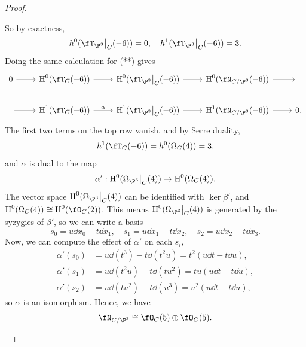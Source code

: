 \documentclass[a4paper]{article}
\begin{document}
\begin{enumerate} [label=\textbf{\arabic*.}, leftmargin=0em]
\begin{proof}
\begin{itemize} [leftmargin=0cm]
                        So by exactness,
                        \begin{equation*}
                            \cdh^0(\restr{\fT_{\P^3}}{C}(-6)) = 0, \quad \cdh^1(\restr{\fT_{\P^3}}{C}(-6)) = 3.
                        \end{equation*}
                        Doing the same calculation for (**) gives
                        \[ \begin{tikzcd}
                                0 \arrow[r]  & {\cH^0(\fT_C(-6))} \arrow[r] & {\cH^0(\restr{\fT_{\P^3}}{C}(-6))} \arrow[r] & {\cH^0(\fN_{C/\P^3}(-6))} \arrow[r] & {} \\
                                {} \arrow[r] & {\cH^1(\fT_C(-6))} \arrow[r, "\alpha"] & {\cH^1(\restr{\fT_{\P^3}}{C}(-6))} \arrow[r] & {\cH^1(\fN_{C/\P^3}(-6))} \arrow[r] & 0.
                            \end{tikzcd} \]
                        The first two terms on the top row vanish, and by Serre duality,
                        \begin{equation*}
                            \cdh^1(\fT_C(-6)) = \cdh^0(\Omega_C(4)) = 3,
                        \end{equation*}
                        and $\alpha$ is dual to the map
                        \begin{equation*}
                            \alpha' : \cH^0(\restr{\Omega_{\P^3}}{C}(4)) \to \cH^0(\Omega_C(4)).
                        \end{equation*}
                        The vector space $\cH^0(\restr{\Omega_{\P^3}}{C}(4))$ can be identified with $\ker{\beta'}$, and $\cH^0(\Omega_C(4)) \cong \cH^0(\fO_C(2))$.
                        This means $\cH^0(\restr{\Omega_{\P^3}}{C}(4))$ is generated by the syzygies of $\beta'$, so we can write a basis
                        \begin{equation*}
                            s_0 = u \dd x_0 - t \dd x_1, \quad s_1 = u \dd x_1 - t \dd x_2, \quad s_2 = u \dd x_2 - t \dd x_3.
                        \end{equation*}
                        Now, we can compute the effect of $\alpha'$ on each $s_i$,
                        \begin{align*}
                            \alpha'(s_0) & = u \dd(t^3) - t \dd(t^2 u) =  t^2(u \dd t - t \dd u),  \\
                            \alpha'(s_1) & = u \dd(t^2 u) - t \dd(tu^2) =  tu (u \dd t - t \dd u), \\
                            \alpha'(s_2) & = u \dd(tu^2) - t \dd(u^3) = u^2(u \dd t - t \dd u),
                        \end{align*}
                        so $\alpha$ is an isomorphism.
                        Hence, we have
                        \begin{equation*}
                            \fN_{C/\P^3} \cong \fO_C(5) \oplus \fO_C(5).
                        \end{equation*}


\end{itemize}
\end{proof}
\end{enumerate}
\end{document}
